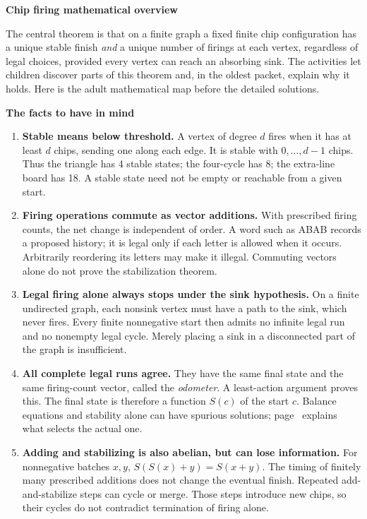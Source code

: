 \documentclass[11pt,letterpaper]{article}
\newcommand{\pagehead}[1]{{\Large\bfseries #1}\par\vspace{3pt}}
\begin{document}
\pagehead{Chip firing mathematical overview}\label{overview}
The central theorem is that on a finite graph a fixed finite chip configuration has a unique stable finish \emph{and} a unique number of firings at each vertex, regardless of legal choices, provided every vertex can reach an absorbing sink. The activities let children discover parts of this theorem and, in the oldest packet, explain why it holds. Here is the adult mathematical map before the detailed solutions.

\textbf{The facts to have in mind}
\begin{enumerate}[leftmargin=18pt,itemsep=4pt,topsep=3pt]
\item \textbf{Stable means below threshold.} A vertex of degree $d$ fires when it has at least $d$ chips, sending one along each edge. It is stable with $0,\ldots,d-1$ chips. Thus the triangle has 4 stable states; the four-cycle has 8; the extra-line board has 18. A stable state need not be empty or reachable from a given start.
\item \textbf{Firing operations commute as vector additions.} With prescribed firing counts, the net change is independent of order. A word such as ABAB records a proposed history; it is legal only if each letter is allowed when it occurs. Arbitrarily reordering its letters may make it illegal. Commuting vectors alone do not prove the stabilization theorem.
\item \textbf{Legal firing alone always stops under the sink hypothesis.} On a finite undirected graph, each nonsink vertex must have a path to the sink, which never fires. Every finite nonnegative start then admits no infinite legal run and no nonempty legal cycle. Merely placing a sink in a disconnected part of the graph is insufficient.
\item \textbf{All complete legal runs agree.} They have the same final state and the same firing-count vector, called the \emph{odometer}. A least-action argument proves this. The final state is therefore a function $S(c)$ of the start $c$. Balance equations and stability alone can have spurious solutions; page~\pageref{determination} explains what selects the actual one.
\item \textbf{Adding and stabilizing is also abelian, but can lose information.} For nonnegative batches $x,y$, $S(S(x)+y)=S(x+y)$. The timing of finitely many prescribed additions does not change the eventual finish. Repeated add-and-stabilize steps can cycle or merge. Those steps introduce new chips, so their cycles do not contradict termination of firing alone.
\end{enumerate}
\end{document}

